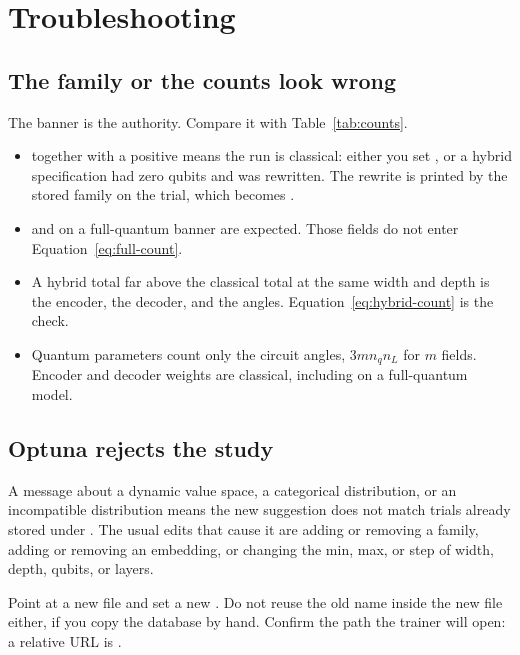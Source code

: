 \chapter{Troubleshooting}
\label{ch:trouble}

\section{The family or the counts look wrong}

The banner is the authority.
Compare it with Table~\ref{tab:counts}.

\begin{itemize}
\item {} together with a positive  means the run is classical: either you set , or a hybrid specification had zero qubits and was rewritten.
  The rewrite is printed by the stored family on the trial, which becomes .
\item {} and  on a full-quantum banner are expected.
  Those fields do not enter Equation~\eqref{eq:full-count}.
\item A hybrid total far above the classical total at the same width and depth is the encoder, the decoder, and the angles.
  Equation~\eqref{eq:hybrid-count} is the check.
\item Quantum parameters count only the circuit angles, \(3 m n_{q} n_{L}\) for \(m\) fields.
  Encoder and decoder weights are classical, including on a full-quantum model.
\end{itemize}

\section{Optuna rejects the study}

A message about a dynamic value space, a categorical distribution, or an incompatible distribution means the new suggestion does not match trials already stored under .
The usual edits that cause it are adding or removing a family, adding or removing an embedding, or changing the min, max, or step of width, depth, qubits, or layers.

Point  at a new file and set a new .
Do not reuse the old name inside the new file either, if you copy the database by hand.
Confirm the path the trainer will open: a relative URL  is .

